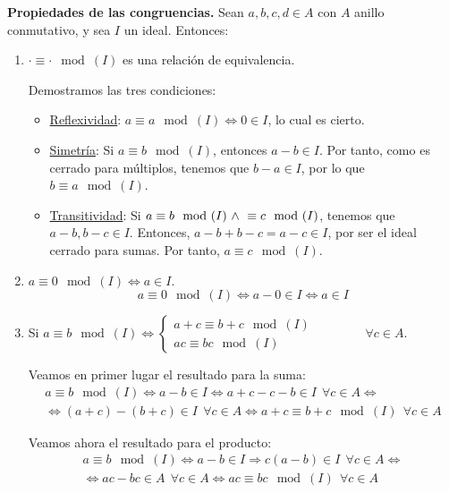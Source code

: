 \textbf{Propiedades de las congruencias.}
Sean $a,b,c,d \in A$ con $A$ anillo conmutativo, y sea $I$ un ideal. Entonces:
\begin{enumerate}
    \item $\cdot\equiv\cdot\mod(I)$ es una relación de equivalencia.

    Demostramos las tres condiciones:
    \begin{itemize}
        \item \underline{Reflexividad}: $a\equiv a\mod (I)\Longleftrightarrow 0\in I$, lo cual es cierto.

        \item \underline{Simetría}: Si $a\equiv b\mod (I)$, entonces $a-b\in I$. Por tanto, como es cerrado para múltiplos, tenemos que $b-a\in I$, por lo que $b\equiv a\mod(I)$.

        \item \underline{Transitividad}: Si $a\equiv b\mod(I)\ \land \  \equiv c\mod (I)$, tenemos que $a-b,b-c\in I$. Entonces, $a-b+b-c=a-c\in I$, por ser el ideal cerrado para sumas. Por tanto, $a\equiv c \mod (I)$.
    \end{itemize}

    \item $a\equiv 0\mod(I) \Longleftrightarrow a\in I$.
    $$a\equiv 0\mod(I) \Longleftrightarrow a-0 \in I \Longleftrightarrow a \in I$$

    \item Si $a\equiv b\mod(I) \Longleftrightarrow \left\{ \begin{array}{l}
        a+c \equiv b+c\mod(I) \\
        ac \equiv bc\mod(I)
    \end{array} \right.\qquad \qquad \forall c \in A$.

    Veamos en primer lugar el resultado para la suma:
    \begin{multline*}
        a\equiv b\mod(I) \Longleftrightarrow a-b \in I \Longleftrightarrow a+c-c-b \in I ~~\forall c \in A \Longleftrightarrow \\
        \Longleftrightarrow (a+c)-(b+c) \in I ~~\forall c \in A \Longleftrightarrow a+c\equiv b+c\mod(I)~~\forall c \in A
    \end{multline*}

    Veamos ahora el resultado para el producto:
    \begin{multline*}
        a\equiv b\mod(I) \Longleftrightarrow a-b \in I \Longrightarrow c(a-b)\in I~~\forall c \in A \Longleftrightarrow \\
        \Longleftrightarrow ac - bc \in A ~~\forall c \in A \Longleftrightarrow ac \equiv bc\mod(I) ~~\forall c \in A 
    \end{multline*}


\end{enumerate}
